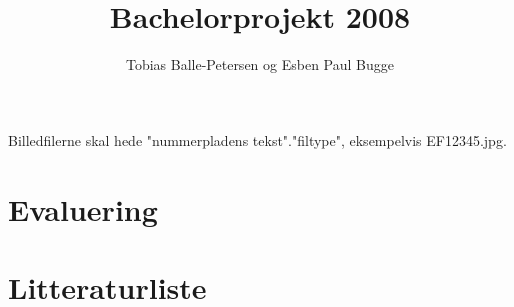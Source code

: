 \documentclass[10pt,a4paper,final]{report}
\author{Tobias Balle-Petersen og Esben Paul Bugge}
\title{Bachelorprojekt 2008}
\begin{document}
\maketitle
Billedfilerne skal hede "nummerpladens tekst"."filtype", eksempelvis EF12345.jpg.

\section{Evaluering}
\section{Litteraturliste}
\end{document}
